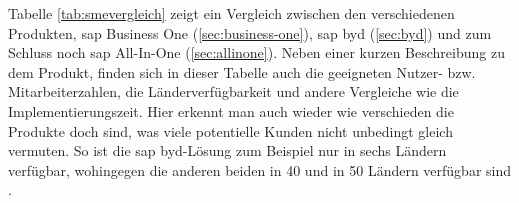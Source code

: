 Tabelle \ref{tab:smevergleich} zeigt ein Vergleich zwischen den verschiedenen Produkten, \gls{sap} Business One (\ref{sec:business-one}), \gls{sap} \gls{byd} (\ref{sec:byd}) und zum Schluss noch \gls{sap} All-In-One (\ref{sec:allinone}). Neben einer kurzen Beschreibung zu dem Produkt, finden sich in dieser Tabelle auch die geeigneten Nutzer- bzw. Mitarbeiterzahlen, die Länderverfügbarkeit und andere Vergleiche wie die Implementierungszeit. Hier erkennt man auch wieder wie verschieden die Produkte doch sind, was viele potentielle Kunden nicht unbedingt gleich vermuten. So ist die \gls{sap} \gls{byd}-Lösung zum Beispiel nur in sechs Ländern verfügbar, wohingegen die anderen beiden in 40 und in 50 Ländern verfügbar sind \cite{SAPin24hrs}.
